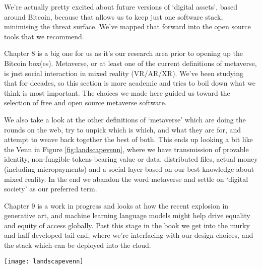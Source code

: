 We’re actually pretty excited about future versions of `digital assets', based around Bitcoin, because that allows us to keep just one software stack, minimising the threat surface. We’ve mapped that forward into the open source tools that we recommend.\par
Chapter 8 is a big one for us as it’s our research area prior to opening up the Bitcoin box(es). Metaverse, or at least one of the current definitions of metaverse, is just social interaction in mixed reality (VR/AR/XR). We’ve been studying that for decades, so this section is more academic and tries to boil down what we think is most important. The choices we made here guided us toward the selection of free and open source metaverse software.\par
We also take a look at the other definitions of `metaverse' which are doing the rounds on the web, try to unpick which is which, and what they are for, and attempt to weave back together the best of both. This ends up looking a bit like the Venn in Figure \ref{fig:landscapevenn}, where we have transmission of provable identity, non-fungible tokens bearing value or data, distributed files, actual money (including micropayments) and a social layer based on our best knowledge about mixed reality. In the end we abandon the word metaverse and settle on `digital society' as our preferred term.\par
Chapter 9 is a work in progress and looks at how the recent explosion in generative art, and machine learning language models might help drive equality and equity of access globally. Past this stage in the book we get into the murky and half developed tail end, where we’re interfacing with our design choices, and the stack which can be deployed into the cloud.\par

\begin{figure*}[ht]\centering %
	\texttt{[image: landscapevenn]}
	\caption{Web 3, Metaverse, and Bitcoin are intersectional technologies.}
	\label{fig:landscapevenn}
\end{figure*}

